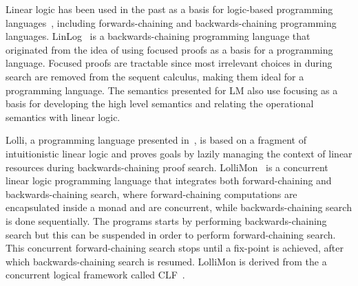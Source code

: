 Linear logic has been used in the past as a basis for logic-based programming
languages~\cite{Miller85anoverview}, including forwards-chaining and
backwards-chaining programming languages.
LinLog~\cite{Andreoli92logicprogramming} is a backwards-chaining programming
language that originated from the idea of using focused proofs as a basis for a
programming language. Focused proofs are tractable since most irrelevant
choices in during search are removed from the sequent calculus, making them
ideal for a programming language. The semantics presented for LM also use
focusing as a basis for developing the high level semantics and relating the
operational semantics with linear logic.

Lolli, a programming language presented in~\cite{Hodas94logicprogramming}, is
based on a fragment of intuitionistic linear logic and proves goals by lazily
managing the context of linear resources during backwards-chaining proof search.
LolliMon~\cite{Lopez:2005:MCL:1069774.1069778} is a concurrent linear logic
programming language that integrates both forward-chaining and
backwards-chaining search, where forward-chaining computations are encapsulated
inside a monad and are concurrent, while backwards-chaining search is done
sequentially. The programs starts by performing backwards-chaining search but
this can be suspended in order to perform forward-chaining search. This
concurrent forward-chaining search stops until a fix-point is achieved, after
which backwards-chaining search is resumed. LolliMon is derived from the a
concurrent logical framework called
CLF~\cite{Watkins:2004uq,Cervesato02aconcurrent,Watkins03aconcurrent}.
